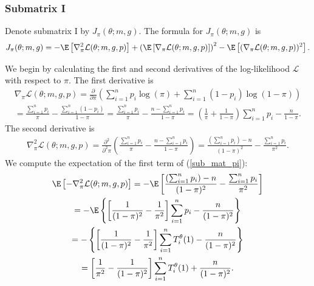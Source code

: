 \documentclass[11pt]{article}
\begin{document}
\begin{appendices}
\begin{refsection}
\subsubsection*{Submatrix I}
Denote submatrix I by $J_{\pi}(\theta; m, g).$ The formula for $J_{\pi}(\theta; m, g)$ is 
\begin{equation}\label{sub_mat_pi}
J_{\pi}(\theta; m, g) = -\E\left[\nabla^2_\pi \mathcal{L}(\theta; m, g, p) \right] + \left(\E\left[ \nabla_\pi \mathcal{L}(\theta; m, g, p) \right] \right)^2 - \E\left[(\nabla_\pi \mathcal{L}(\theta; m, g, p))^2 \right].
\end{equation}

We begin by calculating the first and second derivatives of the log-likelihood $\mathcal{L}$ with respect to $\pi$. The first derivative is
\begin{multline}\label{d_L_d_pi}
\nabla_\pi \mathcal{L}(\theta; m, g, p) = \frac{\partial }{\partial \pi } \left( \sum_{i=1}^n p_i \log(\pi) + \sum_{i=1}^n (1 - p_i) \log(1 - \pi) \right) \\ = \frac{ \sum_{i=1}^n p_i }{\pi} - \frac{ \sum_{i=1}^n (1 - p_i) }{ 1 - \pi } = \frac{\sum_{i=1}^n p_i}{\pi} - \frac{n - \sum_{i=1}^n p_i}{1 - \pi} = \left( \frac{1}{\pi} + \frac{1}{1 - \pi} \right) \sum_{i=1}^n p_i - \frac{n}{1-\pi}.
\end{multline}
The second derivative is
\begin{multline*}
\nabla^2_\pi \mathcal{L}(\theta; m, g, p)  = \frac{\partial^2}{\partial^2\pi} \left( \frac{ \sum_{i=1}^n p_i }{ \pi } - \frac{ n - \sum_{i=1}^n p_i }{1 - \pi}  \right) = \frac{\left( \sum_{i=1}^n p_i \right) - n}{(1 - \pi)^2} - \frac{\sum_{i=1}^n p_i }{ \pi^2 }.
\end{multline*}
We compute the expectation of the first term of (\ref{sub_mat_pi}):
\begin{multline}\label{submat_pi_1}
\E \left[ -\nabla^2_{\pi} \mathcal{L}(\theta; m, g, p)\right] = - \E\left[\frac{ ( \sum_{i=1}^n p_i) - n}{(1 - \pi)^2} - \frac{\sum_{i=1}^n p_i}{\pi^2} \right] \\ = - \E\left\{\left[\frac{1}{(1-\pi)^2} - \frac{1}{\pi^2} \right] \sum_{i=1}^n p_i - \frac{n}{ (1 - \pi)^2 } \right\} \\ = - \left\{\left[ \frac{1}{(1-\pi)^2} - \frac{1}{\pi^2} \right] \sum_{i=1}^n T^\theta_i(1) - \frac{n}{ (1 - \pi)^2}  \right\} \\ = \left[ \frac{1}{\pi^2} - \frac{1}{(1 - \pi)^2} \right] \sum_{i=1}^n T^\theta_i(1) + \frac{n}{(1-\pi)^2}.
\end{multline}

\end{refsection}
\end{appendices}
\end{document}
